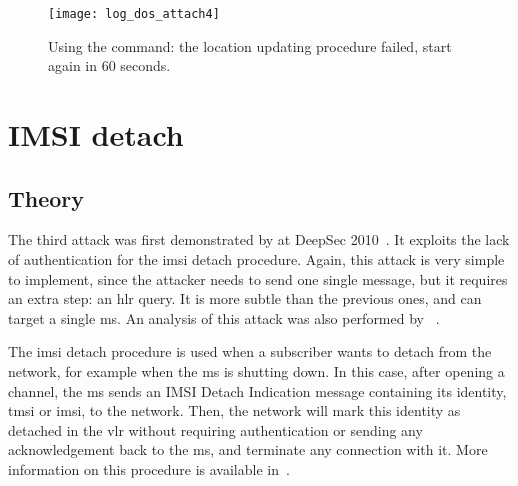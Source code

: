       \iffalse
      \begin{figure}[p]
        \centering
        \texttt{[image: log\_dos\_attach3]}
        \caption{Using the \prog{dos attach} command: the connection is
          aborted as soon as any message is received.\fxnote{Should wait
            until rejected actually, so that the vlr does some work.}}
        \label{fig:log_dos_attach3}
      \end{figure}
      \fi

      \begin{figure}[p]
        \centering
        \texttt{[image: log\_dos\_attach4]}
        \caption{Using the  command: the location updating procedure failed, start again in
        60 seconds.}
        \label{fig:log_dos_attach4}
      \end{figure}


    \section{IMSI detach}

      \subsection{Theory}

      The third attack was first demonstrated by 
      at DeepSec 2010~\cite{munaut_cheap_2010}. It exploits the lack of
      authentication for the \gls{imsi} detach procedure. Again, this
      attack is very simple to implement, since the attacker needs to
      send one single message, but it requires an extra step: an
      \gls{hlr} query. It is more subtle than the previous ones, and can
      target a single \gls{ms}. An analysis of this attack was also
      performed by ~\cite{recas_de_buen_security_2011}.

      The \gls{imsi} detach procedure is used when a subscriber wants to
      detach from the network, for example when the \gls{ms} is shutting
      down. In this case, after opening a channel, the \gls{ms} sends an
      IMSI Detach Indication message containing its identity, \gls{tmsi}
      or \gls{imsi}, to the network. Then, the network will mark this
      identity as detached in the \gls{vlr} without requiring
      authentication or sending any acknowledgement back to the
      \gls{ms}, and terminate any connection with it. More information
      on this procedure is available in~.

